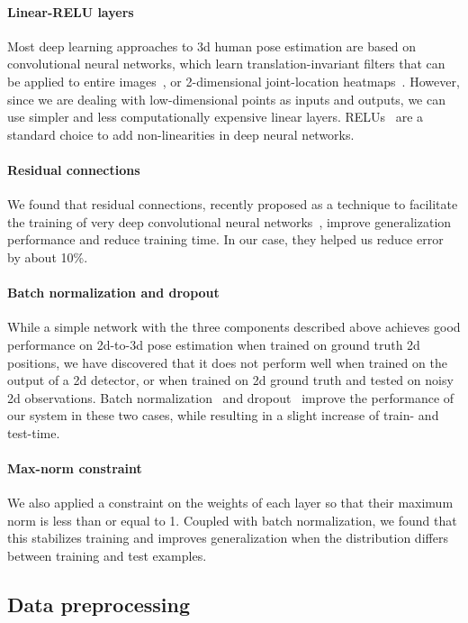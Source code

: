 \documentclass[10pt,twocolumn,letterpaper]{article}
\begin{document}
\paragraph{Linear-RELU layers} Most deep learning approaches to 3d human pose estimation are based on convolutional neural networks, which learn translation-invariant filters that can be applied to entire images~\cite{tekin2016structured,volumetric,park20163d,ghezelghieh2016learning,li2015maximum}, or 2-dimensional joint-location heatmaps~\cite{volumetric, zhou2016sparseness}. However, since we are dealing with low-dimensional points as inputs and outputs, we can use simpler and less computationally expensive linear layers. RELUs~\cite{relu} are a standard choice to add non-linearities in deep neural networks.

\paragraph{Residual connections} We found that residual connections, recently proposed as a technique to facilitate the training of very deep convolutional neural networks~\cite{he2016deep}, improve generalization performance and reduce training time. In our case, they helped us reduce error by about 10\%.

\paragraph{Batch normalization and dropout}
While a simple network with the three components described above achieves good performance on 2d-to-3d pose estimation when trained on ground truth 2d positions, we have discovered that it does not perform well when trained on the output of a 2d detector, or when trained on 2d ground truth and tested on noisy 2d observations. Batch normalization~\cite{batch-norm} and dropout~\cite{dropout} improve the performance of our system in these two cases, while resulting in a slight increase of train- and test-time.

\paragraph{Max-norm constraint}
We also applied a constraint on the weights of each layer so that their maximum norm is less than or equal to 1.
Coupled with batch normalization, we found that this stabilizes training and improves generalization when the distribution differs between training and test examples.

\subsection{Data preprocessing}
\end{document}
